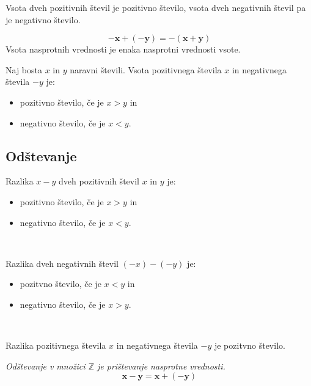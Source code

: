              
                Vsota dveh pozitivnih števil je pozitivno število, vsota dveh negativnih števil pa je negativno število.
             

             
                $$\mathbf{-x+(-y)=-(x+y)}$$
                Vsota nasprotnih vrednosti je enaka nasprotni vrednosti vsote.
             \newline

             
                Naj bosta $x$ in $y$ naravni števili. Vsota pozitivnega števila $x$ in negativnega števila $-y$ je:
                \begin{itemize}
                    \item pozitivno število, če je $x>y$ in
                    \item negativno število, če je $x<y$.
                \end{itemize}
             
         


         
            \subsection{Odštevanje}

             
                Razlika $x-y$ dveh pozitivnih števil $x$ in $y$ je:
                \begin{itemize}
                    \item pozitivno število, če je $x>y$ in 
                    \item negativno število, če je $x<y$.
                \end{itemize}
               ~

             
                Razlika dveh negativnih števil $(-x)-(-y)$ je:
                \begin{itemize}
                    \item pozitvno število, če je $x<y$ in 
                    \item negativno število, če je $x>y$.
                \end{itemize}
               ~

             
                Razlika pozitivnega števila $x$ in negativnega števila $-y$ je pozitvno število.
                ~\newline


            
                \textit{Odštevanje v množici $\mathbb{Z}$ je prištevanje nasprotne vrednosti.}
                $$\mathbf{x-y=x+(-y)} $$
            
